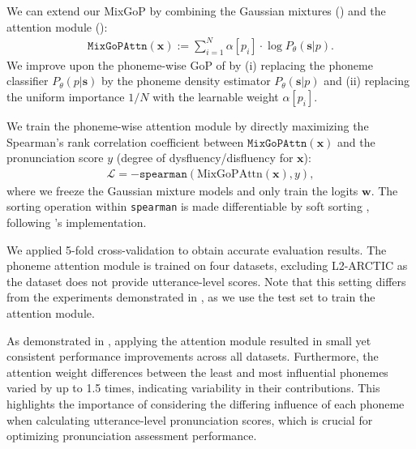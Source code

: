 We can extend our MixGoP by combining the Gaussian mixtures () and the attention module ():
\begin{align}
    \texttt{MixGoPAttn}(\mathbf{x}) := \sum_{i=1}^{N} \alpha[p_i] \cdot \log P_\theta(\mathbf{s}|p).\label{eq:mixtures}
\end{align}
We improve upon the phoneme-wise GoP of  by (i) replacing the phoneme classifier $P_\theta(p|\mathbf{s})$ by the phoneme density estimator $P_\theta(\mathbf{s}|p)$ and (ii) replacing the uniform importance $1/N$ with the learnable weight $\alpha[p_i]$.


We train the phoneme-wise attention module by directly maximizing the Spearman's rank correlation coefficient %
between $\texttt{MixGoPAttn}(\mathbf{x})$ and the pronunciation score $y$ (degree of dysfluency/disfluency for $\mathbf{x}$):
\begin{align}
    \mathcal{L} = - \texttt{spearman}(\text{MixGoPAttn}(\mathbf{x}), y),
\end{align}
where we freeze the Gaussian mixture models and only train the logits $\mathbf{w}$.
The sorting operation within \texttt{spearman} is made differentiable by soft sorting \citep{blondel2020fast}, following \citet{blondel2020fast}'s implementation. %



We applied 5-fold cross-validation to obtain accurate evaluation results.
The phoneme attention module is trained on four datasets, excluding L2-ARCTIC as the dataset does not provide utterance-level scores.
Note that this setting differs from the experiments demonstrated in , as we use the test set to train the attention module.


As demonstrated in , applying the attention module resulted in small yet consistent performance improvements across all datasets. 
Furthermore, the attention weight differences between the least and most influential phonemes varied by up to 1.5 times, indicating variability in their contributions. 
This highlights the importance of considering the differing influence of each phoneme when calculating utterance-level pronunciation scores, which is crucial for optimizing pronunciation assessment performance.


